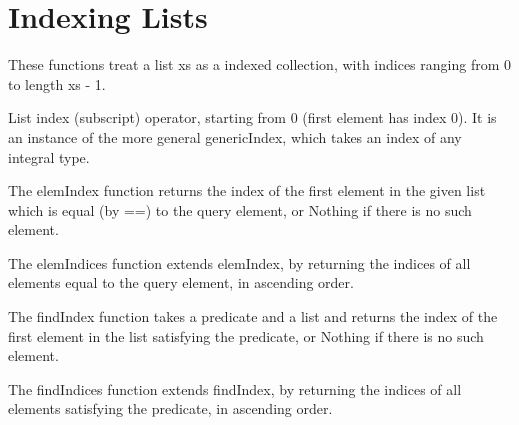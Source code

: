 \section{Indexing Lists}
These functions treat a list xs as a indexed collection, with indices ranging from 0 to length xs - 1.

List index (subscript) operator, starting from 0 (first element has index 0). It is an instance of the more general genericIndex, which takes an index of any integral type.

The elemIndex function returns the index of the first element in the given list which is equal (by ==) to the query element, or Nothing if there is no such element.

The elemIndices function extends elemIndex, by returning the indices of all elements equal to the query element, in ascending order.

The findIndex function takes a predicate and a list and returns the index of the first element in the list satisfying the predicate, or Nothing if there is no such element.

The findIndices function extends findIndex, by returning the indices of all elements satisfying the predicate, in ascending order.